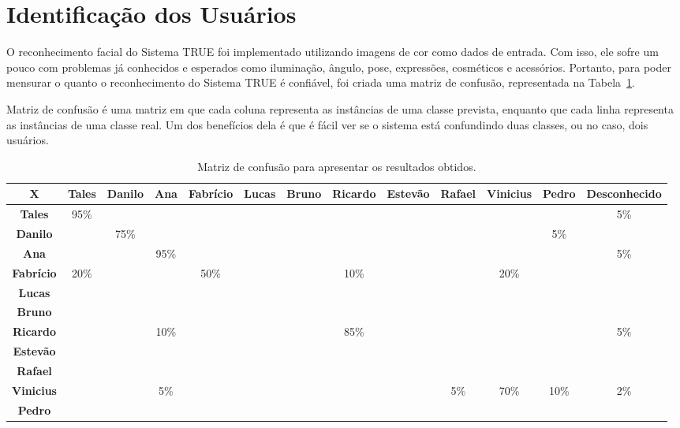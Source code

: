 \section{Identificação dos Usuários}
	 
	O reconhecimento facial do Sistema TRUE foi implementado utilizando imagens de cor como dados de entrada. Com isso, ele sofre um pouco com problemas já conhecidos e esperados como iluminação, ângulo, pose, expressões, cosméticos e acessórios. Portanto, para poder mensurar o quanto o reconhecimento do Sistema TRUE é confiável, foi criada uma matriz de confusão, representada na Tabela~\ref{tab:matriz-confusao}.

	Matriz de confusão é uma matriz em que cada coluna representa as instâncias de uma classe prevista, enquanto que cada linha representa as instâncias de uma classe real. Um dos benefícios dela é que é fácil ver se o sistema está confundindo duas classes, ou no caso, dois usuários.
	
	\begin{landscape}
	\begin{table}[htb]
		\begin{center}
			\caption{Matriz de confusão para apresentar os resultados obtidos.}
			\begin{tabular}{|c|c|c|c|c|c|c|c|c|c|c|c|c|}
				\hline \bf X & \bf Tales & \bf Danilo & \bf Ana & \bf Fabrício & \bf Lucas & \bf Bruno & \bf Ricardo & \bf Estevão & \bf Rafael & \bf Vinicius & \bf Pedro & \bf Desconhecido\\
				\hline \bf Tales & 95\% & & & & & & & & & & & 5\%\\
				\hline \bf Danilo & & 75\% & & & & & & & & & 5\% &\\
				\hline \bf Ana & & & 95\% & & & & & & & & & 5\%\\
				\hline \bf Fabrício & 20\% & & & 50\% & & & 10\% & & & 20\% & &\\
				\hline \bf Lucas & & & & & & & & & & & &\\
				\hline \bf Bruno & & & & & & & & & & & &\\
				\hline \bf Ricardo & & & 10\% & & & & 85\% & & & & & 5\%\\
				\hline \bf Estevão & & & & & & & & & & & &\\
				\hline \bf Rafael & & & & & & & & & & & &\\
				\hline \bf Vinicius & & & 5\% & & & & & & 5\% & 70\% & 10\% & 2\%\\
				\hline \bf Pedro & & & & & & & & & & & &\\
				\hline
			\end{tabular}
		\end{center}
		\label{tab:matriz-confusao}
	\end{table}
	\end{landscape}
